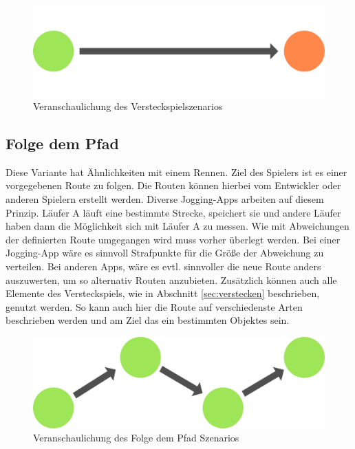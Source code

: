\begin{figure}[h]
    \centering
    \includegraphics[width=.8\textwidth]{files/lbgArten/searchAndFind}
    \caption{Veranschaulichung des Versteckspielszenarios}
    \label{szenA}
\end{figure}

\subsection{Folge dem Pfad} 

Diese Variante hat Ähnlichkeiten mit einem Rennen. Ziel des Spielers ist es einer vorgegebenen Route zu folgen. Die Routen können hierbei vom Entwickler oder anderen Spielern erstellt werden. Diverse Jogging-Apps arbeiten auf diesem Prinzip. Läufer A läuft eine bestimmte Strecke, speichert sie und andere Läufer haben dann die Möglichkeit sich mit Läufer A zu messen. Wie mit Abweichungen der definierten Route umgegangen wird muss vorher überlegt werden. Bei einer Jogging-App wäre es sinnvoll Strafpunkte für die Größe der Abweichung zu verteilen. Bei anderen Apps, wäre es evtl. sinnvoller die neue Route anders auszuwerten, um so alternativ Routen anzubieten.   Zusätzlich können auch alle Elemente des Versteckspiels, wie in Abschnitt \ref{sec:verstecken} beschrieben, genutzt werden. So kann auch hier die Route auf verschiedenste Arten beschrieben werden und am Ziel das ein bestimmten Objektes sein. 
\cite{creativeworklineGmbH:vb}


\begin{figure}[h]
    \centering
    \includegraphics[width=.8\textwidth]{files/lbgArten/followThePath}
    \caption{Veranschaulichung des Folge dem Pfad Szenarios}
    \label{szenB}
\end{figure}



